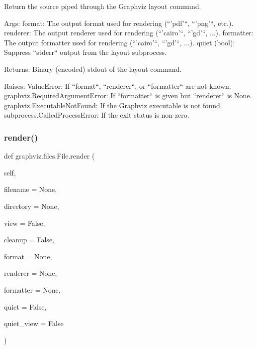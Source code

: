 \begin{DoxyVerb}Return the source piped through the Graphviz layout command.

Args:
    format: The output format used for rendering (``'pdf'``, ``'png'``, etc.).
    renderer: The output renderer used for rendering (``'cairo'``, ``'gd'``, ...).
    formatter: The output formatter used for rendering (``'cairo'``, ``'gd'``, ...).
    quiet (bool): Suppress ``stderr`` output from the layout subprocess.

Returns:
    Binary (encoded) stdout of the layout command.

Raises:
    ValueError: If ``format``, ``renderer``, or ``formatter`` are not known.
    graphviz.RequiredArgumentError: If ``formatter`` is given but ``renderer`` is None.
    graphviz.ExecutableNotFound: If the Graphviz executable is not found.
    subprocess.CalledProcessError: If the exit status is non-zero.
\end{DoxyVerb}
 \mbox{\label{classgraphviz_1_1files_1_1File_a7a3b4fc4e816c395bf3878b5cadc44d3}} 
\subsubsection{\texorpdfstring{render()}{render()}}
{\footnotesize\ttfamily def graphviz.\+files.\+File.\+render (\begin{DoxyParamCaption}\item[{}]{self,  }\item[{}]{filename = {\ttfamily None},  }\item[{}]{directory = {\ttfamily None},  }\item[{}]{view = {\ttfamily False},  }\item[{}]{cleanup = {\ttfamily False},  }\item[{}]{format = {\ttfamily None},  }\item[{}]{renderer = {\ttfamily None},  }\item[{}]{formatter = {\ttfamily None},  }\item[{}]{quiet = {\ttfamily False},  }\item[{}]{quiet\+\_\+view = {\ttfamily False} }\end{DoxyParamCaption})}

